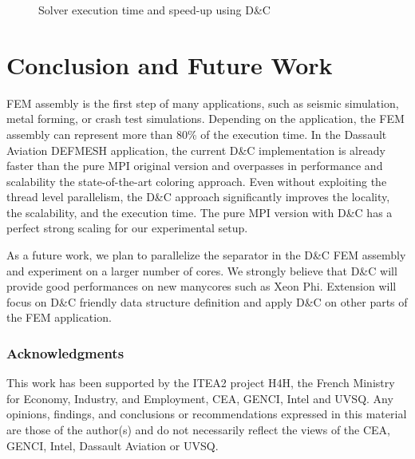 \documentclass[10pt]{IOS-Book-Article}
\begin{document}
\begin{figure}[htp]
 \centering
 \caption{Solver execution time and speed-up using D\&C}
 \label{fig:solCurves}
\end{figure}

\section{Conclusion and Future Work}
FEM assembly is the first step of many applications, such as seismic simulation, metal forming, or crash test simulations.
Depending on the application, the FEM assembly can represent more than 80\% of the execution time.
In the Dassault Aviation DEFMESH application, the current D\&C implementation is already faster than the pure MPI original version and overpasses in performance and scalability the state-of-the-art coloring approach.
Even without exploiting the thread level parallelism, the D\&C approach  significantly improves the locality, the scalability, and the execution time.
The pure MPI version with D\&C has a perfect strong scaling for our experimental setup.

As a future work, we plan to parallelize the separator in the D\&C FEM assembly and experiment on a larger number of cores.
We strongly believe that D\&C will provide good performances on new manycores such as Xeon Phi.
Extension will focus on D\&C friendly data structure definition and apply D\&C on other parts of the FEM application. 

\subsubsection*{Acknowledgments} \scriptsize{
This work has been supported by the ITEA2 project H4H, the French Ministry for Economy,
Industry, and Employment, CEA, GENCI, Intel and UVSQ.  Any opinions,
findings, and conclusions or recommendations expressed in this
material are those of the author(s) and do not necessarily reflect the
views of the CEA, GENCI, Intel, Dassault Aviation or UVSQ.}



\end{document}
